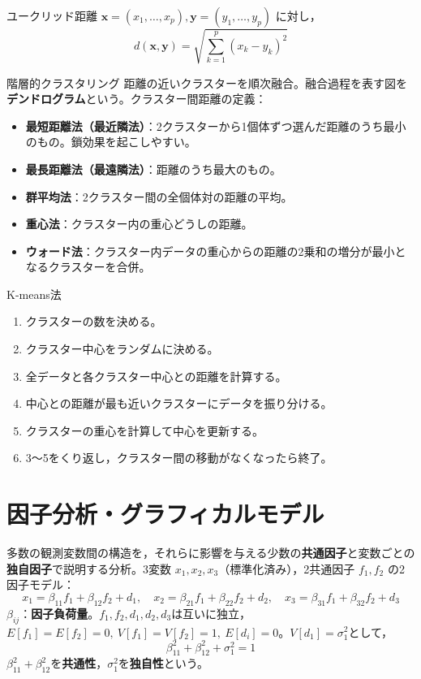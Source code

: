 \documentclass[a4paper,11pt]{ltjsarticle}
\begin{document}
\begin{term}{ユークリッド距離}
$\bm x=(x_1,\dots,x_p),\bm y=(y_1,\dots,y_p)$ に対し，
\[
d(\bm x,\bm y) = \sqrt{\sum_{k=1}^p (x_k-y_k)^2}
\]
\end{term}

\begin{term}{階層的クラスタリング}
距離の近いクラスターを順次融合。融合過程を表す図を\textbf{デンドログラム}という。クラスター間距離の定義：
\begin{itemize}
\item \textbf{最短距離法（最近隣法）}：2クラスターから1個体ずつ選んだ距離のうち最小のもの。鎖効果を起こしやすい。
\item \textbf{最長距離法（最遠隣法）}：距離のうち最大のもの。
\item \textbf{群平均法}：2クラスター間の全個体対の距離の平均。
\item \textbf{重心法}：クラスター内の重心どうしの距離。
\item \textbf{ウォード法}：クラスター内データの重心からの距離の2乗和の増分が最小となるクラスターを合併。
\end{itemize}
\end{term}

\begin{term}{K-means法}
\begin{enumerate}[label=\arabic*.]
\item クラスターの数を決める。
\item クラスター中心をランダムに決める。
\item 全データと各クラスター中心との距離を計算する。
\item 中心との距離が最も近いクラスターにデータを振り分ける。
\item クラスターの重心を計算して中心を更新する。
\item 3〜5をくり返し，クラスター間の移動がなくなったら終了。
\end{enumerate}
\end{term}


\section{因子分析・グラフィカルモデル}

多数の観測変数間の構造を，それらに影響を与える少数の\textbf{共通因子}と変数ごとの\textbf{独自因子}で説明する分析。3変数 $x_1,x_2,x_3$（標準化済み），2共通因子 $f_1,f_2$ の2因子モデル：
\[
x_1 = \beta_{11}f_1+\beta_{12}f_2+d_1,\quad
x_2 = \beta_{21}f_1+\beta_{22}f_2+d_2,\quad
x_3 = \beta_{31}f_1+\beta_{32}f_2+d_3
\]
$\beta_{ij}$：\textbf{因子負荷量}。$f_1,f_2,d_1,d_2,d_3$は互いに独立，$E[f_1]=E[f_2]=0,\ V[f_1]=V[f_2]=1,\ E[d_i]=0$。$V[d_1]=\sigma_1^2$として，
\[
\beta_{11}^2+\beta_{12}^2+\sigma_1^2 = 1
\]
$\beta_{11}^2+\beta_{12}^2$を\textbf{共通性}，$\sigma_1^2$を\textbf{独自性}という。
\end{document}
